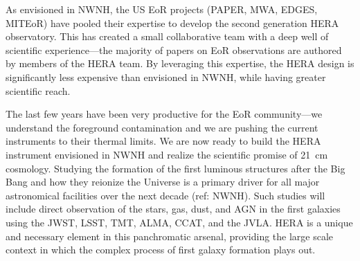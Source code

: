 \documentclass[preprint]{aastex}
\begin{document}
As envisioned in NWNH, the US EoR projects (PAPER, MWA, EDGES, MITEoR) have
pooled their expertise to develop the second generation HERA observatory. This
has created a small collaborative team with a deep well of scientific
experience---the majority of papers on EoR observations are authored by members
of the HERA team. By leveraging this expertise, the HERA design is significantly
less expensive than envisioned in NWNH, while having greater scientific reach.

The last few years have been very productive for the EoR community---we
understand the foreground contamination and we are pushing the current
instruments to their thermal limits. We are now ready to build the HERA
instrument envisioned in NWNH and realize the scientific promise of 21~cm
cosmology.
Studying the formation of the first luminous structures after the Big
Bang and how they reionize the Universe is a primary driver for all %
major astronomical facilities over the next decade (ref: NWNH).
Such studies will include direct observation of the stars, gas, dust, and AGN in the
first galaxies using the JWST, LSST, TMT, ALMA, CCAT, and the JVLA. HERA is %
a unique and necessary element in this panchromatic arsenal, providing
the large scale context in which the complex process of first galaxy
formation plays out.

\clearpage
\setcounter{page}{1}
\thispagestyle{empty}
%
%

%

\end{document}
